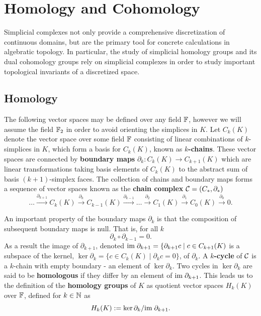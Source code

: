 \section{Homology and Cohomology} %
\label{sec:homology}

Simplicial complexes not only provide a comprehensive discretization of continuous domains, but are the primary tool for concrete calculations in algebratic topology.
In particular, the study of simplicial homology groups and its dual cohomology groups rely on simplicial complexes in order to study important topological invariants of a discretized space.

\subsection{Homology}

The following vector spaces may be defined over any field $\mathbb{F}$, however we will assume the field $\mathbb{F}_2$ in order to avoid orienting the simplices in $K$.
Let $C_k(K)$ denote the vector space over some field $\mathbb{F}$ consisting of linear combinations of $k$-simplices in $K$, which form a basis for $C_k(K)$, known as \textbf{$k$-chains}.
These vector spaces are connected by \textbf{boundary maps} $\partial_k:C_k(K)\to C_{k+1}(K)$ which are linear transformations taking basis elements of $C_k(K)$ to the abstract sum of basis $(k+1)$-simplex faces.
The collection of chains and boundary maps forms a sequence of vector spaces known as the \textbf{chain complex} $\mathcal{C} = (C_*,\partial_*)$
\[
    \ldots\xrightarrow{\partial_{k+1}}
    C_k(K)\xrightarrow{\partial_{k}}
    C_{k-1}(K)\xrightarrow{\partial_{k-1}}
    \ldots\xrightarrow{\partial_2}
    C_1(K)\xrightarrow{\partial_{1}}
    C_0(K)\xrightarrow{\partial_0} 0.
\]

An important property of the boundary maps $\partial_k$ is that the composition of subsequent boundary maps is null.
That is, for all $k$
\[ \partial_k\circ\partial_{k-1} = 0. \]
As a result the image of $\partial_{k+1}$, denoted $\mathrm{im}\;\partial_{k+1} = \{\partial_{k+1}c\mid c\in C_{k+1}(K)$ is a subspace of the kernel, $\ker\partial_k = \{c\in C_k(K)\mid \partial_k c = 0\}$, of $\partial_k$.
A \textbf{$k$-cycle} of $\mathcal{C}$ is a $k$-chain with empty boundary - an element of $\ker\partial_k$.
Two cycles in $\ker\partial_k$ are said to be \textbf{homologous} if they differ by an element of $\mathrm{im}\;\partial_{k+1}$.
This leads us to the definition of the \textbf{homology groups} of $K$ as quotient vector spaces $H_k(K)$ over $\mathbb{F}$, defined for $k\in\mathbb{N}$ as
\[ H_k(K) := \ker\partial_k/\mathrm{im}\;\partial_{k+1}.\]

